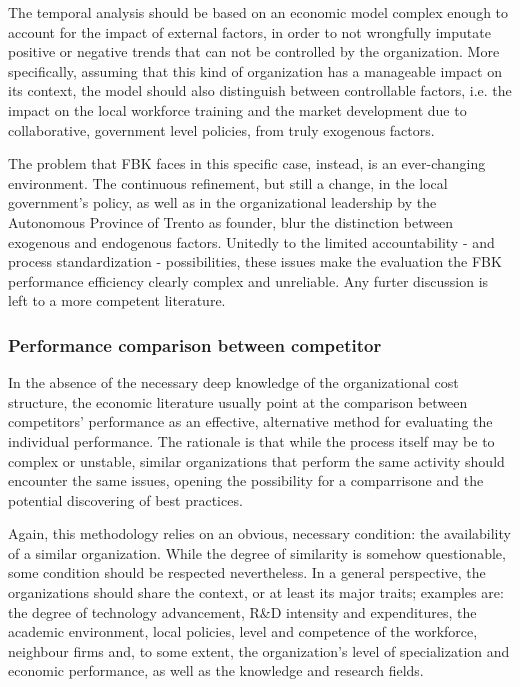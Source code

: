 The temporal analysis should be based on an economic model complex enough to account for the impact of external factors, in order to not wrongfully imputate positive or negative trends that can not be controlled by the organization. More specifically, assuming that this kind of organization has a manageable impact on its context, the model should also distinguish between controllable factors, i.e. the impact on the local workforce training and the market development due to collaborative, government level policies, from truly exogenous factors.

The problem that FBK faces in this specific case, instead, is an ever-changing environment. The continuous refinement, but still a change, in the local government's policy, as well as in the organizational leadership by the Autonomous Province of Trento as founder, blur the distinction between exogenous and endogenous factors. Unitedly to the limited accountability - and process standardization - possibilities, these issues make the evaluation the FBK performance efficiency clearly complex and unreliable. Any furter discussion is left to a more competent literature.

\subsubsection{Performance comparison between competitor}

In the absence of the necessary deep knowledge of the organizational cost structure, the economic literature usually point at the comparison between competitors' performance as an effective, alternative method for evaluating the individual performance. The rationale is that while the process itself may be to complex or unstable, similar organizations that perform the same activity should encounter the same issues, opening the possibility for a comparrisone and the potential discovering of best practices.

Again, this methodology relies on an obvious, necessary condition: the availability of a similar organization. While the degree of similarity is somehow questionable, some condition should be respected nevertheless. In a general perspective, the organizations should share the context, or at least its major traits; examples are: the degree of technology advancement, R\&D intensity and expenditures, the academic environment, local policies, level and competence of the workforce, neighbour firms and, to some extent, the organization's level of specialization and economic performance, as well as the knowledge and research fields.

